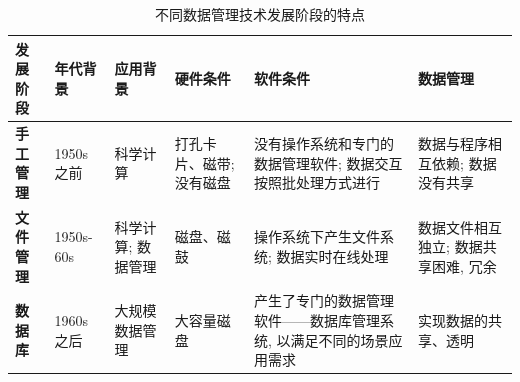\documentclass[10pt,UTF8]{book} %
\begin{document}
\begin{table}[H]
    \centering
    \caption{不同数据管理技术发展阶段的特点}
    \begin{tabular}{p{}|p{}p{}p{}p{}p{}}
        \hline
        \textbf{发展阶段} & \textbf{年代背景} & \textbf{应用背景} & \textbf{硬件条件} & \textbf{软件条件} & \textbf{数据管理} \\ 
        \hline
        \textbf{手工管理} & 1950s 之前 & 科学计算 & 打孔卡片、磁带; \newline 没有磁盘 & 没有操作系统和专门的数据管理软件; \newline 数据交互按照批处理方式进行 & 数据与程序相互依赖; \newline 数据没有共享 \\ 
        \hline
        \textbf{文件管理} & 1950s-60s & 科学计算; \newline 数据管理 & 磁盘、磁鼓 & 操作系统下产生文件系统; \newline 数据实时在线处理 & 数据文件相互独立; \newline 数据共享困难, 冗余 \\ 
        \hline
        \textbf{数据库} & 1960s 之后 & 大规模数据管理 & 大容量磁盘 & 产生了专门的数据管理软件——数据库管理系统, 以满足不同的场景应用需求 & 实现数据的共享、透明 \\ 
        \hline
    \end{tabular}
\end{table}
\end{document}
